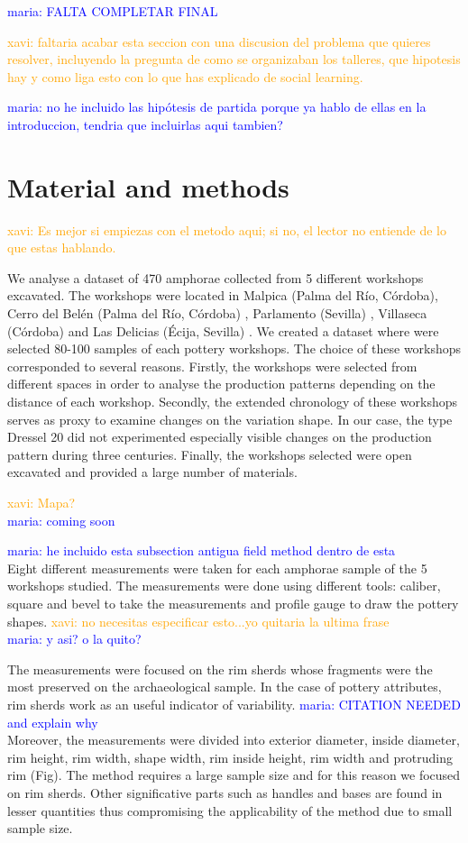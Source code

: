 \documentclass[review]{elsarticle}
\newcommand{\memo}[2]{\textcolor{#1}{#2}}
\newcommand{\xavi}[1]{\memo{orange}{xavi: #1\\}}
\newcommand{\maria}[1]{\memo{blue}{maria: #1\\}}
\begin{document}
\maria{FALTA COMPLETAR FINAL}


\xavi{faltaria acabar esta seccion con una discusion del problema que quieres resolver, incluyendo la pregunta de como se organizaban los talleres, que hipotesis hay y como liga esto con lo que has explicado de social learning.}

\maria{no he incluido las hipótesis de partida porque ya hablo de ellas en la introduccion, tendria que incluirlas aqui tambien?}

\section{Material and methods}

\xavi{Es mejor si empiezas con el metodo aqui; si no, el lector no entiende de lo que estas hablando.}

We analyse a dataset of 470 amphorae collected from 5 different workshops excavated. The workshops were located in Malpica (Palma del R\'io, C\'ordoba), Cerro del Bel\'en (Palma del R\'io, C\'ordoba) \citep{diaz_trujillo_excavacion_1992}, Parlamento (Sevilla) \citep{garcia_vargas_anforas_2000}, Villaseca (C\'ordoba)\citep{garcia_vargas_enrique_excavacion_????} and Las Delicias (\'Ecija, Sevilla) \citep{fernandez_excavacion_2001,_atelier_2014}. We created a dataset where were selected 80-100 samples of each pottery workshops. The choice of these workshops corresponded to several reasons. Firstly, the workshops were selected from different spaces in order to analyse the production patterns depending on the distance of each workshop. Secondly, the extended chronology of these workshops serves as proxy to examine changes on the variation shape. In our case, the type Dressel 20 did not experimented especially visible changes on the production pattern during three centuries.%
Finally, the workshops selected were open excavated and provided a large number of materials.   

\xavi{Mapa?}
\maria{coming soon}

\maria{he incluido esta subsection antigua field method dentro de esta}
Eight different measurements were taken for each amphorae sample of the 5 workshops studied. The measurements were done using different tools: caliber, square and bevel to take the measurements and profile gauge to draw the pottery shapes. \xavi{no necesitas especificar esto...yo quitaria la ultima frase} \maria{y asi? o la quito?}

The measurements were focused on the rim sherds whose fragments were the most preserved on the archaeological sample. In the case of pottery attributes, rim sherds work as an useful indicator of variability. \maria{CITATION NEEDED and explain why}
Moreover, the measurements were divided into exterior diameter, inside diameter, rim height, rim width, shape width, rim inside height, rim width and protruding rim (Fig). The method requires a large sample size and for this reason we focused on rim sherds. Other significative parts such as handles and bases are found in lesser quantities thus compromising the applicability of the method due to small sample size.
\end{document}

